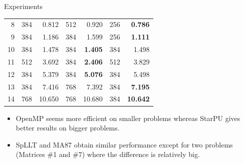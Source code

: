 \documentclass{beamer}
\newcommand{\db}[1]{\textcolor{mblue}{#1\xspace}}
\newcommand{\dd}[1]{\textcolor{gray!70}{#1\xspace}}
\begin{document}
\begin{frame}{Experiments}
\begin{center}
{{\begin{tabular}{r|rr|rr|rr}
       8   & 384                              & \dd{0.812}                 & 512  & \dd{0.920}     & 256 & \bf \dd{0.786}  \\
       9   & 384                              & \dd{1.186}                 & 384  & \dd{1.599}     & 256 & \bf \dd{1.111}  \\
       10  & 384                              & \dd{1.478}                 & 384  & \bf \dd{1.405} & 384 & \dd{1.498}      \\
       11  & 512                              & \dd{3.692}                 & 384  & \bf \dd{2.406} & 512 & \dd{3.829}      \\
       12  & 384                              & \dd{5.379}                 & 384  & \bf \dd{5.076} & 384 & \dd{5.498}      \\
       13  & 384                              & \dd{7.416}                 & 768  & \dd{7.392}     & 384 & \bf \dd{7.195}  \\
       14  & 768                              & \dd{10.650}                & 768  & \dd{10.680}    & 384 & \bf \dd{10.642} \\
      \hline
  \end{tabular}}
  }
  \end{center}
  
  \begin{itemize}
  \item \db{OpenMP} seems more efficient on smaller problems whereas
    \db{StarPU} gives better results on bigger problems.
  \item SpLLT and MA87 obtain similar performance except for two
    problems (Matrices \#1 and \#7) where the difference is relatively big.
  \end{itemize}
\end{frame}
\end{document}
